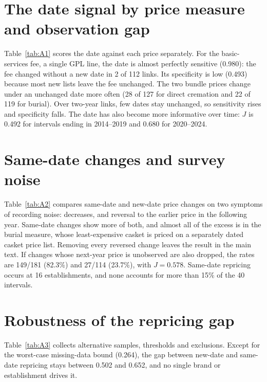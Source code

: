 \section{The date signal by price measure and observation gap}
Table~\ref{tab:A1} scores the date against each price separately. For the basic-services fee, a single GPL line, the date is almost perfectly sensitive (0.980): the fee changed without a new date in 2 of 112 links. Its specificity is low (0.493) because most new lists leave the fee unchanged. The two bundle prices change under an unchanged date more often (28 of 127 for direct cremation and 22 of 119 for burial). Over two-year links, few dates stay unchanged, so sensitivity rises and specificity falls. The date has also become more informative over time: $J$ is 0.492 for intervals ending in 2014--2019 and 0.680 for 2020--2024.



\section{Same-date changes and survey noise}
Table~\ref{tab:A2} compares same-date and new-date price changes on two symptoms of recording noise: decreases, and reversal to the earlier price in the following year. Same-date changes show more of both, and almost all of the excess is in the burial measure, whose least-expensive casket is priced on a separately dated casket price list. Removing every reversed change leaves the result in the main text. If changes whose next-year price is unobserved are also dropped, the rates are 149/181 (82.3\%) and 27/114 (23.7\%), with $J=0.578$. Same-date repricing occurs at 16 establishments, and none accounts for more than 15\% of the 40 intervals.



\section{Robustness of the repricing gap}
Table~\ref{tab:A3} collects alternative samples, thresholds and exclusions. Except for the worst-case missing-data bound (0.264), the gap between new-date and same-date repricing stays between 0.502 and 0.652, and no single brand or establishment drives it.



